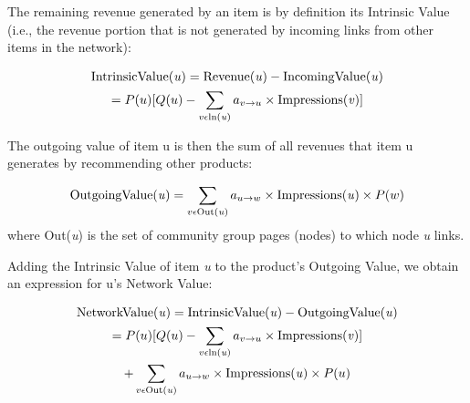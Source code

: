 The remaining revenue generated by an item is by definition its Intrinsic Value (i.e., the revenue portion that is not generated by incoming links from other items in the network):


\begin{multline}
\textrm{IntrinsicValue(\textit{u})} = \textrm{Revenue(\textit{u})} - \textrm{IncomingValue(\textit{u})} \\ = P(u) [ Q(u) - \sum_{v \epsilon \textrm{ln(\textit{u})}} a_{v \rightarrow u} \times \textrm{Impressions(\textit{v})}]
\end{multline}

The outgoing value of item u is then the sum of all revenues that item u generates by recommending other products:

\begin{equation}
\textrm{OutgoingValue(\textit{u})} = \sum_{v \epsilon \textrm{Out(\textit{u})}} a_{u \rightarrow w} \times \textrm{Impressions(\textit{u})} \times P(w)
\end{equation}
where Out(\textit{u}) is the set of community group pages (nodes) to which node \textit{u} links.

Adding the Intrinsic Value of item \textit{u} to the product’s Outgoing Value, we obtain an expression for u’s Network Value:


\begin{multline}
\textrm{NetworkValue(\textit{u})} = \textrm{IntrinsicValue(\textit{u})} - \textrm{OutgoingValue(\textit{u})} \\ = P(u) [ Q(u) - \sum_{v \epsilon \textrm{ln(\textit{u})}} a_{v \rightarrow u} \times \textrm{Impressions(\textit{v})}] \\ + \sum_{v \epsilon \textrm{Out(\textit{u})}} a_{u \rightarrow w} \times \textrm{Impressions(\textit{u})} \times P(u)
\end{multline}

